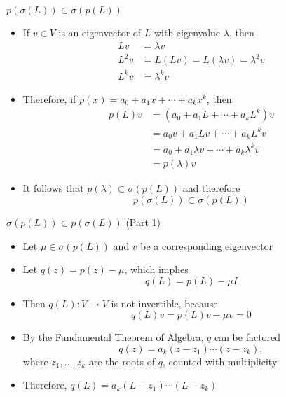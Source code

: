 \documentclass[usenames,dvipsnames,10pt]{beamer}
\begin{document}
\begin{frame}
  {$p(\sigma(L)) \subset \sigma(p(L))$}

  \begin{itemize}
  \item If $v \in V$ is an eigenvector of $L$ with eigenvalue $\lambda$, then
    \begin{align*}
      Lv &= \lambda v\\
      L^2v &= L(Lv) = L(\lambda v) = \lambda^2v\\
      L^kv &= \lambda^kv
    \end{align*}
  \item Therefore, if $p(x) = a_0 + a_1x + \cdots + a_kx^k$, then
    \begin{align*}
      p(L)v &= (a_0 + a_1L + \cdots + a_kL^k)v\\
            &= a_0v + a_1Lv + \cdots + a_kL^kv\\
            &= a_0 + a_1\lambda v + \cdots + a_k\lambda^kv\\
            &= p(\lambda)v
    \end{align*}
  \item It follows that $p(\lambda) \subset \sigma(p(L))$ and therefore
    \[
      p(\sigma(L)) \subset \sigma(p(L))
    \]
  \end{itemize}
\end{frame}

\begin{frame}
  {$\sigma(p(L)) \subset p(\sigma(L))$ (Part 1)}

  \begin{itemize}
  \item Let $\mu \in \sigma(p(L))$ and $v$ be a corresponding eigenvector
  \item Let $q(z) = p(z)-\mu$, which implies
    \[
      q(L) = p(L) - \mu I
    \]
  \item Then $q(L): V \rightarrow V$ is not invertible, because
    \[ q(L)v = p(L)v - \mu v = 0 \]
  \item By the Fundamental Theorem of Algebra, $q$ can be factored
    \[
      q(z) = a_k(z-z_1)\cdots(z-z_k),
    \]
    where $z_1, \dots, z_k$ are the roots of $q$, counted with multiplicity
  \item Therefore, $q(L) = a_k(L-z_1)\cdots(L-z_k)$
  \end{itemize}
\end{frame}
\end{document}
